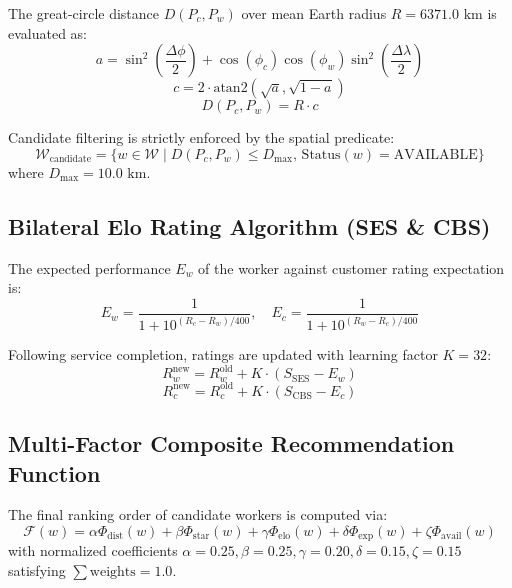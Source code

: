 \documentclass[conference]{IEEEtran}
\begin{document}
The great-circle distance $D(P_c, P_w)$ over mean Earth radius $R = 6371.0\text{ km}$ is evaluated as:
\begin{equation}
a = \sin^2\left(\frac{\Delta\phi}{2}\right) + \cos(\phi_c)\cos(\phi_w)\sin^2\left(\frac{\Delta\lambda}{2}\right)
\end{equation}
\begin{equation}
c = 2 \cdot \text{atan2}\left(\sqrt{a}, \sqrt{1 - a}\right)
\end{equation}
\begin{equation}
D(P_c, P_w) = R \cdot c
\end{equation}

Candidate filtering is strictly enforced by the spatial predicate:
\begin{equation}
\mathcal{W}_{\text{candidate}} = \{ w \in \mathcal{W} \mid D(P_c, P_w) \le D_{\max}, \, \text{Status}(w) = \text{AVAILABLE} \}
\end{equation}
where $D_{\max} = 10.0\text{ km}$.

\subsection{Bilateral Elo Rating Algorithm (SES \& CBS)}
The expected performance $E_w$ of the worker against customer rating expectation is:
\begin{equation}
E_w = \frac{1}{1 + 10^{(R_c - R_w) / 400}}, \quad E_c = \frac{1}{1 + 10^{(R_w - R_c) / 400}}
\end{equation}

Following service completion, ratings are updated with learning factor $K = 32$:
\begin{equation}
R_w^{\text{new}} = R_w^{\text{old}} + K \cdot (S_{\text{SES}} - E_w)
\end{equation}
\begin{equation}
R_c^{\text{new}} = R_c^{\text{old}} + K \cdot (S_{\text{CBS}} - E_c)
\end{equation}

\subsection{Multi-Factor Composite Recommendation Function}
The final ranking order of candidate workers is computed via:
\begin{equation}
\mathcal{F}(w) = \alpha \Phi_{\text{dist}}(w) + \beta \Phi_{\text{star}}(w) + \gamma \Phi_{\text{elo}}(w) + \delta \Phi_{\text{exp}}(w) + \zeta \Phi_{\text{avail}}(w)
\end{equation}
with normalized coefficients $\alpha = 0.25, \beta = 0.25, \gamma = 0.20, \delta = 0.15, \zeta = 0.15$ satisfying $\sum \text{weights} = 1.0$.
\end{document}
